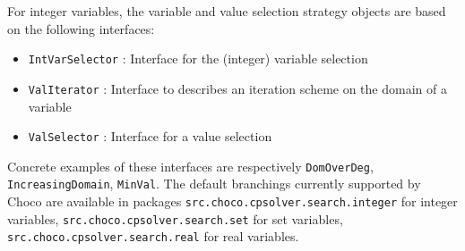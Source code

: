 For integer variables, the variable and value selection strategy objects are based on the following interfaces:
\begin{itemize}
	\item \texttt{IntVarSelector} : Interface for the (integer) variable selection
	\item \texttt{ValIterator} : Interface to describes an iteration scheme on the domain of a variable
	\item \texttt{ValSelector} : Interface for a value selection
\end{itemize}
Concrete examples of these interfaces are respectively \texttt{DomOverDeg}, \texttt{IncreasingDomain}, \texttt{MinVal}.
The default branchings currently supported by Choco are available in packages \texttt{src.choco.cpsolver.search.integer} for integer variables, \texttt{src.choco.cpsolver.search.set} for set variables, \texttt{src.choco.cpsolver.search.real} for real variables.

